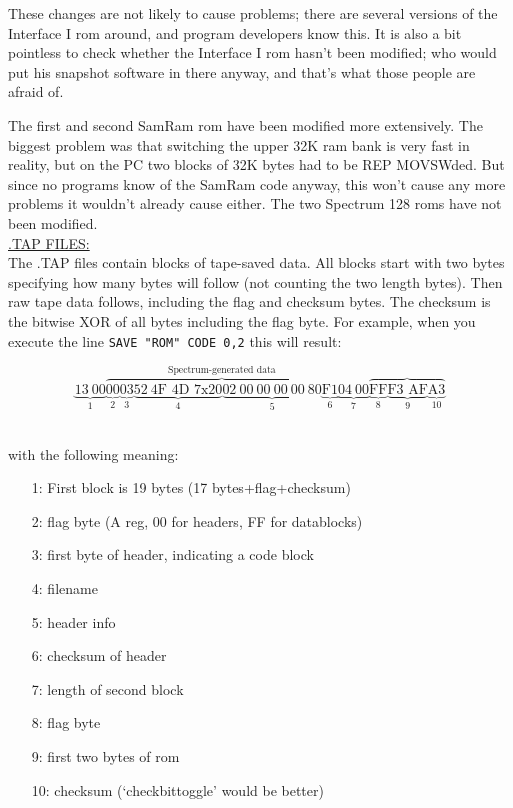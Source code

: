 \noindent
    These changes are not likely to cause problems; there are several
    versions of the Interface I rom around, and program developers know
    this.  It is also a bit pointless to check whether the Interface I rom
    hasn't been modified; who would put his snapshot software in there
    anyway, and that's what those people are afraid of.

    The first and second SamRam rom have been modified more extensively. The
    biggest problem was that switching the upper 32K ram bank is very fast
    in reality, but on the PC two blocks of 32K bytes had to be REP
    MOVSWded.  But since no programs know of the SamRam code anyway, this
    won't cause any more problems it wouldn't already cause either.
    The two Spectrum 128 roms have not been modified.\\

\newpage
\noindent
  \underline{.TAP FILES:}\\

    The .TAP files contain blocks of tape-saved data.  All blocks start with
    two bytes specifying how many bytes will follow (not counting the two
    length bytes).  Then raw tape data follows, including the flag and
    checksum bytes.  The checksum is the bitwise XOR of all bytes including
    the flag byte.  For example, when you execute the line
    \verb|SAVE "ROM" CODE 0,2| this will result:

\[
       \underbrace{13~00}_1 
       \overbrace{
         \underbrace{00}_2 \underbrace{03}_3
	 \underbrace{52~\mbox{4F~4D~7x20}}_4
	 \underbrace{02~00~00~00~00~80}_5
         \underbrace{\mbox{F1}}_6}^{\mbox{Spectrum-generated data}}
       \underbrace{04~00}_7
       \overbrace{
	 \underbrace{\mbox{FF}}_8 \underbrace{\mbox{F3~AF}}_9
	 \underbrace{\mbox{A3}}_{10}}
\]\\
{\footnotesize
\indent with the following meaning:
\begin{itemize}
  \begin{itemize}
    \item[1:]     First block is 19 bytes (17 bytes+flag+checksum)
    \item[2:]     flag byte (A reg, 00 for headers, FF for datablocks)
    \item[3:]     first byte of header, indicating a code block
    \item[4:]     filename
    \item[5:]     header info
    \item[6:]     checksum of header
    \item[7:]     length of second block
    \item[8:]     flag byte
    \item[9:]     first two bytes of rom
    \item[10:]    checksum (`checkbittoggle' would be better)
  \end{itemize}
\end{itemize}
}

